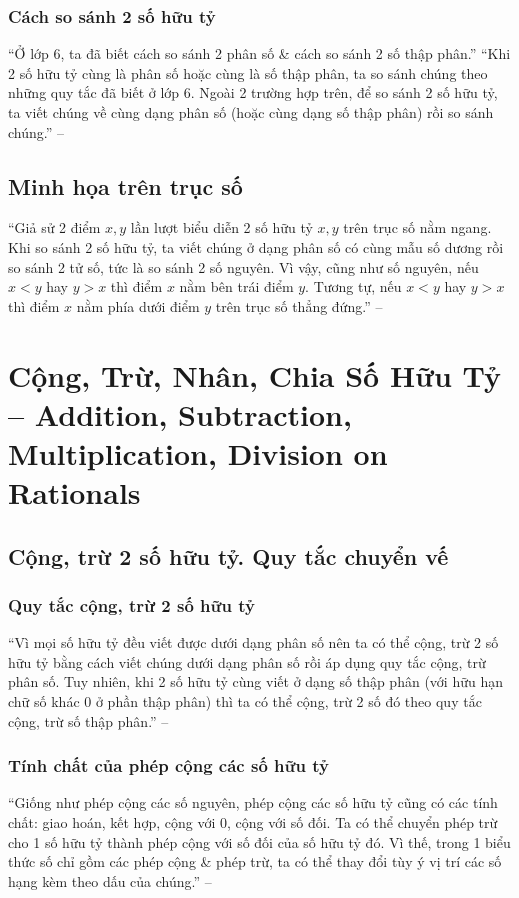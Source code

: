 \documentclass[oneside]{book}
\numberwithin{equation}{section}
\begin{document}
\subsubsection{Cách so sánh 2 số hữu tỷ}
``Ở lớp 6, ta đã biết cách so sánh 2 phân số \& cách so sánh 2 số thập phân.'' ``Khi 2 số hữu tỷ cùng là phân số hoặc cùng là số thập phân, ta so sánh chúng theo những quy tắc đã biết ở lớp 6. Ngoài 2 trường hợp trên, để so sánh 2 số hữu tỷ, ta viết chúng về cùng dạng phân số (hoặc cùng dạng số thập phân) rồi so sánh chúng.'' -- \cite[p. 9]{SGK_Toan_7_Canh_Dieu_tap_1}

\subsection{Minh họa trên trục số}
``Giả sử 2 điểm $x,y$ lần lượt biểu diễn 2 số hữu tỷ $x,y$ trên trục số nằm ngang. Khi so sánh 2 số hữu tỷ, ta viết chúng ở dạng phân số có cùng mẫu số dương rồi so sánh 2 tử số, tức là so sánh 2 số nguyên. Vì vậy, cũng như số nguyên, nếu $x < y$ hay $y > x$ thì điểm $x$ nằm bên trái điểm $y$. Tương tự, nếu $x < y$ hay $y > x$ thì điểm $x$ nằm phía dưới điểm $y$ trên trục số thẳng đứng.'' -- \cite[pp. 9--10]{SGK_Toan_7_Canh_Dieu_tap_1}

\section{Cộng, Trừ, Nhân, Chia Số Hữu Tỷ -- Addition, Subtraction, Multiplication, Division on Rationals}

\subsection{Cộng, trừ 2 số hữu tỷ. Quy tắc chuyển vế}

\subsubsection{Quy tắc cộng, trừ 2 số hữu tỷ}
``Vì mọi số hữu tỷ đều viết được dưới dạng phân số nên ta có thể cộng, trừ 2 số hữu tỷ bằng cách viết chúng dưới dạng phân số rồi áp dụng quy tắc cộng, trừ phân số. Tuy nhiên, khi 2 số hữu tỷ cùng viết ở dạng số thập phân (với hữu hạn chữ số khác $0$ ở phần thập phân) thì ta có thể cộng, trừ 2 số đó theo quy tắc cộng, trừ số thập phân.'' -- \cite[p. 12]{SGK_Toan_7_Canh_Dieu_tap_1}

\subsubsection{Tính chất của phép cộng các số hữu tỷ}
``Giống như phép cộng các số nguyên, phép cộng các số hữu tỷ cũng có các tính chất: giao hoán, kết hợp, cộng với $0$, cộng với số đối. Ta có thể chuyển phép trừ cho 1 số hữu tỷ thành phép cộng với số đối của số hữu tỷ đó. Vì thế, trong 1 biểu thức số chỉ gồm các phép cộng \& phép trừ, ta có thể thay đổi tùy ý vị trí các số hạng kèm theo dấu của chúng.'' -- \cite[p. 13]{SGK_Toan_7_Canh_Dieu_tap_1}
\end{document}
